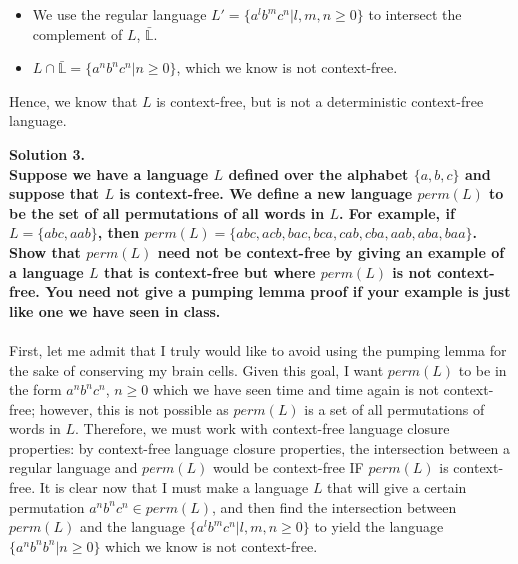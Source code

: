 \documentclass{article}
\begin{document}
\begin{itemize}
    \item We use the regular language \(L' = \{a^l b^m c^n | l,m,n \geq 0\}\) to intersect the complement of \(L\), \(\bar{\mathbb{L}}\).
    \item \(L \cap \bar{\mathbb{L}} = \{a^n b^n c^n | n\geq 0\}\), which we know is not context-free.
\end{itemize}
Hence, we know that \(L\) is context-free, but is not a deterministic context-free language.

\newpage

\noindent \textbf{Solution 3. 
\\Suppose we have a language \(L\) defined over the alphabet \(\{a, b, c\}\) and suppose that \(L\) is context-free. We define a new language \(perm(L)\) to be the set of all permutations of all words in \(L\). For example, if \(L=\{abc , aab\}\), then \(perm(L) = \{abc, acb, bac, bca, cab, cba, aab ,aba, baa\}\). Show that \(perm(L)\) need not be context-free by giving an example of a language \(L\) that is context-free but where \(perm(L)\) is not context-free. You need not give a pumping lemma proof if your example is just like one we have seen in class.
}
\\
\\First, let me admit that I truly would like to avoid using the pumping lemma for the sake of conserving my brain cells. Given this goal, I want \(perm(L)\) to be in the form \(a^n b^n c^n\), \(n \geq 0\) which we have seen time and time again is not context-free; however, this is not possible as \(perm(L)\) is a set of all permutations of words in \(L\). Therefore, we must work with context-free language closure properties: by context-free language closure properties, the intersection between a regular language and \(perm(L)\) would be context-free IF \(perm(L)\) is context-free. It is clear now that I must make a language \(L\) that will give a certain permutation \(a^n b^n c^n \in perm(L)\), and then find the intersection between \(perm(L)\) and the language \(\{a^l b^m c^n | l,m,n \geq 0\}\) to yield the language \(\{a^n b^n b^n | n \geq 0\}\) which we know is not context-free.
\end{document}
